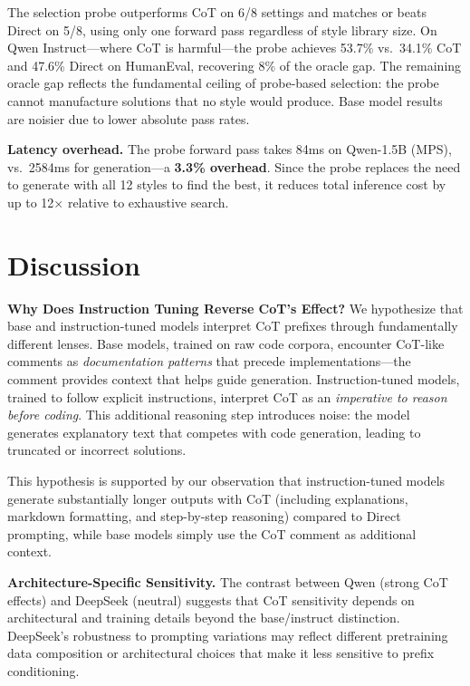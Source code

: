 \documentclass{article}
\begin{document}
The selection probe outperforms CoT on 6/8 settings and matches or beats Direct on 5/8, using only one forward pass regardless of style library size. On Qwen Instruct---where CoT is harmful---the probe achieves 53.7\% vs.\ 34.1\% CoT and 47.6\% Direct on HumanEval, recovering 8\% of the oracle gap. The remaining oracle gap reflects the fundamental ceiling of probe-based selection: the probe cannot manufacture solutions that no style would produce. Base model results are noisier due to lower absolute pass rates.

\textbf{Latency overhead.} The probe forward pass takes 84ms on Qwen-1.5B (MPS), vs.\ 2584ms for generation---a \textbf{3.3\% overhead}. Since the probe replaces the need to generate with all 12 styles to find the best, it reduces total inference cost by up to 12$\times$ relative to exhaustive search.

\section{Discussion}

\textbf{Why Does Instruction Tuning Reverse CoT's Effect?} We hypothesize that base and instruction-tuned models interpret CoT prefixes through fundamentally different lenses. Base models, trained on raw code corpora, encounter CoT-like comments as \emph{documentation patterns} that precede implementations---the comment provides context that helps guide generation. Instruction-tuned models, trained to follow explicit instructions, interpret CoT as an \emph{imperative to reason before coding}. This additional reasoning step introduces noise: the model generates explanatory text that competes with code generation, leading to truncated or incorrect solutions.

This hypothesis is supported by our observation that instruction-tuned models generate substantially longer outputs with CoT (including explanations, markdown formatting, and step-by-step reasoning) compared to Direct prompting, while base models simply use the CoT comment as additional context.

\textbf{Architecture-Specific Sensitivity.} The contrast between Qwen (strong CoT effects) and DeepSeek (neutral) suggests that CoT sensitivity depends on architectural and training details beyond the base/instruct distinction. DeepSeek's robustness to prompting variations may reflect different pretraining data composition or architectural choices that make it less sensitive to prefix conditioning.
\end{document}
